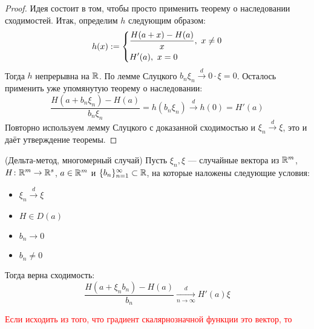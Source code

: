 \begin{proof}
	Идея состоит в том, чтобы просто применить теорему о наследовании сходимостей. Итак, определим $h$ следующим образом:
	\[
		h(x) := \left\{\begin{aligned}
			&{\frac{H(a + x) - H(a)}{x},\ x \neq 0}
			\\
			&{H'(a),\ x = 0}
		\end{aligned}\right.
	\]
	Тогда $h$ непрерывна на $\mathbb{R}$. По лемме Слуцкого $b_n\xi_n \xrightarrow{d} 0 \cdot \xi = 0$. Осталось применить уже упомянутую теорему о наследовании:
	\[
		\frac{H(a + b_n\xi_n) - H(a)}{b_n\xi_n} = h(b_n\xi_n) \xrightarrow{d} h(0) = H'(a)
	\]
	Повторно используем лемму Слуцкого с доказанной сходимостью и $\xi_n \xrightarrow{d} \xi$, это и даёт утверждение теоремы.
\end{proof}

\begin{theorem} (Дельта-метод, многомерный случай)
	Пусть $\xi_n, \xi$ --- случайные вектора из $\mathbb{R}^m$, $H \colon \mathbb{R}^m \to \mathbb{R}^s$, $a \in \mathbb{R}^m$ и $\{b_n\}_{n = 1}^\infty \subset \mathbb{R}$, на которые наложены следующие условия:
	\begin{itemize}
		\item $\xi_n \xrightarrow{d} \xi$
		
		\item $H \in D(a)$
		
		\item $b_n \to 0$
		
		\item $b_n \neq 0$
	\end{itemize}
	Тогда верна сходимость:
	\[
		\frac{H(a + \xi_nb_n) - H(a)}{b_n} \xrightarrow[n \to \infty]{d} H'(a)\xi
	\]
\end{theorem}

\textcolor{red}{Если исходить из того, что градиент скалярнозначной функции это вектор, то  }